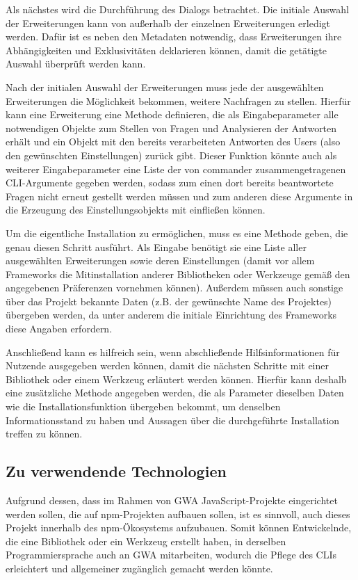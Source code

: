 Als nächstes wird die Durchführung des Dialogs betrachtet. Die initiale Auswahl der Erweiterungen kann von außerhalb der einzelnen Erweiterungen erledigt werden. Dafür ist es neben den Metadaten notwendig, dass Erweiterungen ihre Abhängigkeiten und Exklusivitäten deklarieren können, damit die getätigte Auswahl überprüft werden kann.

Nach der initialen Auswahl der Erweiterungen muss jede der ausgewählten Erweiterungen die Möglichkeit bekommen, weitere Nachfragen zu stellen. Hierfür kann eine Erweiterung eine Methode definieren, die als Eingabeparameter alle notwendigen Objekte zum Stellen von Fragen und Analysieren der Antworten erhält und ein Objekt mit den bereits verarbeiteten Antworten des Users (also den gewünschten Einstellungen) zurück gibt. Dieser Funktion könnte auch als weiterer Eingabeparameter eine Liste der von commander zusammengetragenen \gls{CLI}-Argumente gegeben werden, sodass zum einen dort bereits beantwortete Fragen nicht erneut gestellt werden müssen und zum anderen diese Argumente in die Erzeugung des Einstellungsobjekts mit einfließen können.

Um die eigentliche Installation zu ermöglichen, muss es eine Methode geben, die genau diesen Schritt ausführt. Als Eingabe benötigt sie eine Liste aller ausgewählten Erweiterungen sowie deren Einstellungen (damit vor allem Frameworks die Mitinstallation anderer Bibliotheken oder Werkzeuge gemäß den angegebenen Präferenzen vornehmen können). Außerdem müssen auch sonstige über das Projekt bekannte Daten (z.B. der gewünschte Name des Projektes) übergeben werden, da unter anderem die initiale Einrichtung des Frameworks diese Angaben erfordern.

Anschließend kann es hilfreich sein, wenn abschließende Hilfsinformationen für Nutzende ausgegeben werden können, damit die nächsten Schritte mit einer Bibliothek oder einem Werkzeug erläutert werden können. Hierfür kann deshalb eine zusätzliche Methode angegeben werden, die als Parameter dieselben Daten wie die Installationsfunktion übergeben bekommt, um denselben Informationsstand zu haben und Aussagen über die durchgeführte Installation treffen zu können.

\subsection{Zu verwendende Technologien}
Aufgrund dessen, dass im Rahmen von \gls{GWA} JavaScript-Projekte eingerichtet werden sollen, die auf \gls{npm}-Projekten aufbauen sollen, ist es sinnvoll, auch dieses Projekt innerhalb des \gls{npm}-Ökosystems aufzubauen. Somit können Entwickelnde, die eine Bibliothek oder ein Werkzeug erstellt haben, in derselben Programmiersprache auch an \gls{GWA} mitarbeiten, wodurch die Pflege des \gls{CLI}s erleichtert und allgemeiner zugänglich gemacht werden könnte.


